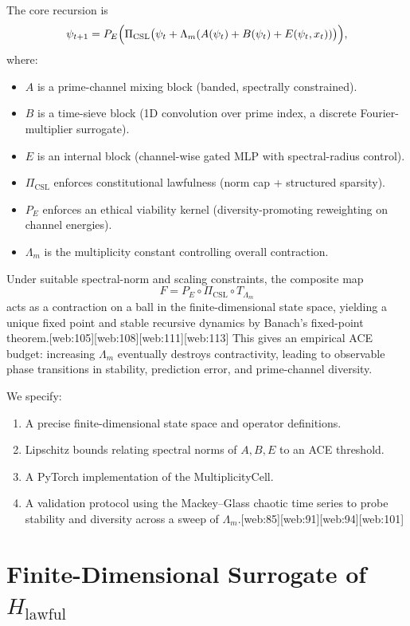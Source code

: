 \documentclass[11pt]{article}
\theoremstyle{definition}
\theoremstyle{plain}
\begin{document}
The core recursion is
\[
  \psi_{t+1} = P_E\Bigl(\Pi_{\mathrm{CSL}}\bigl(\psi_t + \Lambda_m(A(\psi_t) + B(\psi_t) + E(\psi_t,x_t))\bigr)\Bigr),
\]
where:
\begin{itemize}[leftmargin=*]
  \item $A$ is a prime-channel mixing block (banded, spectrally constrained).
  \item $B$ is a time-sieve block (1D convolution over prime index, a discrete Fourier-multiplier surrogate).
  \item $E$ is an internal block (channel-wise gated MLP with spectral-radius control).
  \item $\Pi_{\mathrm{CSL}}$ enforces constitutional lawfulness (norm cap + structured sparsity).
  \item $P_E$ enforces an ethical viability kernel (diversity-promoting reweighting on channel energies).
  \item $\Lambda_m$ is the multiplicity constant controlling overall contraction.
\end{itemize}

Under suitable spectral-norm and scaling constraints, the composite map
\[
  F = P_E \circ \Pi_{\mathrm{CSL}} \circ T_{\Lambda_m}
\]
acts as a contraction on a ball in the finite-dimensional state space, yielding a unique fixed point and stable recursive dynamics by Banach's fixed-point theorem.[web:105][web:108][web:111][web:113]
This gives an empirical ACE budget: increasing $\Lambda_m$ eventually destroys contractivity, leading to observable phase transitions in stability, prediction error, and prime-channel diversity.

We specify:
\begin{enumerate}[leftmargin=*]
  \item A precise finite-dimensional state space and operator definitions.
  \item Lipschitz bounds relating spectral norms of $A,B,E$ to an ACE threshold.
  \item A PyTorch implementation of the MultiplicityCell.
  \item A validation protocol using the Mackey--Glass chaotic time series to probe stability and diversity across a sweep of $\Lambda_m$.[web:85][web:91][web:94][web:101]
\end{enumerate}

\section{Finite-Dimensional Surrogate of $H_{\mathrm{lawful}}$}
\end{document}

